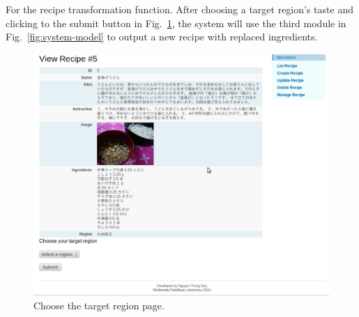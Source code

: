 For the recipe transformation function. After choosing a target region's taste and clicking to the submit button in Fig.~\ref{fig:choose_target}, the system will use the third module in Fig.~\ref{fig:system-model} to output a new recipe with replaced ingredients.
 
\begin{figure}
\centering
\includegraphics[scale=0.5]{choose_target.eps}
\caption{Choose the target region page.}
\label{fig:choose_target}
\end{figure}  
